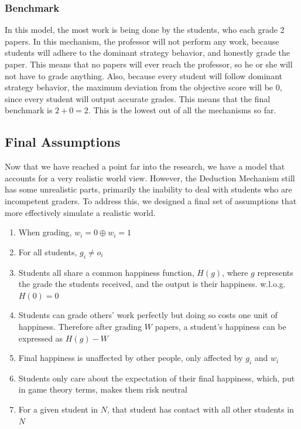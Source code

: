 \documentclass[12pt, Arial]{article}
\begin{document}
\subsubsection{Benchmark}
In this model, the most work is being done by the students, who each grade 2 papers. In this mechanism, the professor will not perform any work, because students will adhere to the dominant strategy behavior, and honestly grade the paper. This means that no papers will ever reach the professor, so he or she will not have to grade anything. Also, because every student will follow dominant strategy behavior, the maximum deviation from the objective score will be 0, since every student will output accurate grades. This means that the final benchmark is $2+0=2$. This is the lowest out of all the mechanisms so far.
\subsection{Final Assumptions}
Now that we have reached a point far into the research, we have a model that accounts for a very realistic world view. However, the Deduction Mechanism still has some unrealistic parts, primarily the inability to deal with students who are incompetent graders. To address this, we designed a final set of assumptions that more effectively simulate a realistic world.

\begin{enumerate}[itemsep=0pt, parsep=0pt]
	\item When grading, $w_i=0 \oplus w_i=1$
	\item For all students, $g_i \neq o_i$
	\item Students all share a common happiness function, $H(g)$, where $g$ represents the grade the students received, and the output is their happiness. w.l.o.g. $H(0)=0$
	\item Students can grade others' work perfectly but doing so costs one unit of happiness. Therefore after grading $W$ papers, a student's happiness can be expressed as $H(g)-W$
	\item Final happiness is unaffected by other people, only affected by $g_i$ and $w_i$
	\item Students only care about the expectation of their final happiness, which, put in game theory terms, makes them risk neutral
	\item For a given student in $N$, that student has contact with all other students in $N$
\end{enumerate}
\newpage
\end{document}
